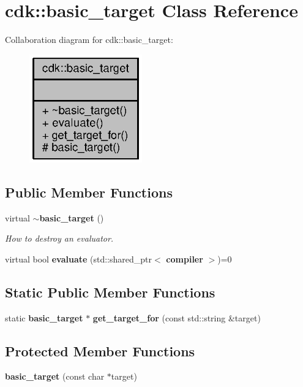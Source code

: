 \section{cdk\+:\+:basic\+\_\+target Class Reference}
\label{classcdk_1_1basic__target}


Collaboration diagram for cdk\+:\+:basic\+\_\+target\+:
\nopagebreak
\begin{figure}[H]
\begin{center}
\leavevmode
\includegraphics[width=138pt]{classcdk_1_1basic__target__coll__graph}
\end{center}
\end{figure}
\subsection*{Public Member Functions}
\begin{DoxyCompactItemize}
\item 
virtual {\bf $\sim$basic\+\_\+target} ()\label{classcdk_1_1basic__target_aaa74cb39cf10b2735b1abc15680898fa}

\begin{DoxyCompactList}\small\item\em How to destroy an evaluator. \end{DoxyCompactList}\item 
virtual bool {\bf evaluate} (std\+::shared\+\_\+ptr$<$ {\bf compiler} $>$)=0
\end{DoxyCompactItemize}
\subsection*{Static Public Member Functions}
\begin{DoxyCompactItemize}
\item 
static {\bf basic\+\_\+target} $\ast$ {\bf get\+\_\+target\+\_\+for} (const std\+::string \&target)
\end{DoxyCompactItemize}
\subsection*{Protected Member Functions}
\begin{DoxyCompactItemize}
\item 
{\bfseries basic\+\_\+target} (const char $\ast$target)\label{classcdk_1_1basic__target_a789431eed534e3827eb2686ed00f30b8}

\end{DoxyCompactItemize}



